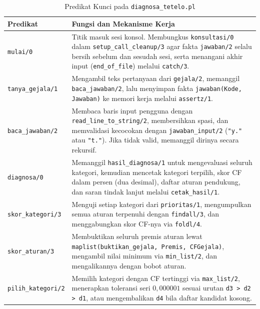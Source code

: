 \documentclass[12pt,a4paper]{report}
\begin{document}
\begin{table}[H]
\centering
\caption{Predikat Kunci pada \texttt{diagnosa\_tetelo.pl}}
\label{tab:predikat}
\small
\begin{tabularx}{\textwidth}{l Y}
\toprule
\textbf{Predikat} & \textbf{Fungsi dan Mekanisme Kerja} \\
\midrule
\texttt{mulai/0} & Titik masuk sesi konsol. Membungkus \texttt{konsultasi/0} dalam \texttt{setup\_call\_cleanup/3} agar fakta \texttt{jawaban/2} selalu bersih sebelum dan sesudah sesi, serta menangani akhir input (\texttt{end\_of\_file}) melalui \texttt{catch/3}. \\
\texttt{tanya\_gejala/1} & Mengambil teks pertanyaan dari \texttt{gejala/2}, memanggil \texttt{baca\_jawaban/2}, lalu menyimpan fakta \texttt{jawaban(Kode, Jawaban)} ke memori kerja melalui \texttt{assertz/1}. \\
\texttt{baca\_jawaban/2} & Membaca baris input pengguna dengan \texttt{read\_line\_to\_string/2}, membersihkan spasi, dan memvalidasi kecocokan dengan \texttt{jawaban\_input/2} (\texttt{"y."} atau \texttt{"t."}). Jika tidak valid, memanggil dirinya secara rekursif. \\
\texttt{diagnosa/0} & Memanggil \texttt{hasil\_diagnosa/1} untuk mengevaluasi seluruh kategori, kemudian mencetak kategori terpilih, skor CF dalam persen (dua desimal), daftar aturan pendukung, dan saran tindak lanjut melalui \texttt{cetak\_hasil/1}. \\
\texttt{skor\_kategori/3} & Menguji setiap kategori dari \texttt{prioritas/1}, mengumpulkan semua aturan terpenuhi dengan \texttt{findall/3}, dan menggabungkan skor CF-nya via \texttt{foldl/4}. \\
\texttt{skor\_aturan/3} & Membuktikan seluruh premis aturan lewat \texttt{maplist(buktikan\_gejala, Premis, CFGejala)}, mengambil nilai minimum via \texttt{min\_list/2}, dan mengalikannya dengan bobot aturan. \\
\texttt{pilih\_kategori/2} & Memilih kategori dengan CF tertinggi via \texttt{max\_list/2}, menerapkan toleransi seri $0{,}000001$ sesuai urutan \texttt{d3 > d2 > d1}, atau mengembalikan \texttt{d4} bila daftar kandidat kosong. \\
\bottomrule
\end{tabularx}
\end{table}
\end{document}
